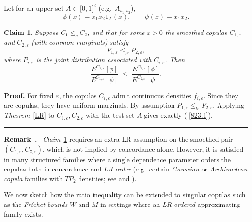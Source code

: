 \documentclass[onecolumn]{article}
\newtheorem{claim}[theorem]{Claim}
\newenvironment{remark}{  \refstepcounter{theorem}  \par\medskip\noindent\textbf{Remark~\thetheorem.}\rmfamily\ }{\par\medskip}
\newenvironment{proof}[1][Proof]{\noindent\textbf{#1.} }{\ \rule{0.5em}{0.5em}}
\begin{document}
Let for an upper set $A\subset \lbrack 0,1]^{2}$ (e.g.\ $A_{s_{1},s_{2}}$), 
\begin{equation}
\phi (x)=x_{1}x_{2}1_{A}(x),\qquad \psi (x)=x_{1}x_{2}.  \label{823}
\end{equation}

\begin{claim}
\label{smoothed-ratio} Suppose $C_{1}\leq _{c}C_{2}$, and that for some $%
\varepsilon >0$ the smoothed copulas $C_{1,\varepsilon }$ and $%
C_{2,\varepsilon }$ (with common marginals) satisfy 
\begin{equation}
P_{1,\varepsilon }\leq _{lr}P_{2,\varepsilon },  \label{823.0}
\end{equation}%
where $P_{i,\varepsilon }$ is the joint distribution associated with $%
C_{i,\varepsilon }$. Then 
\begin{equation}
\frac{E^{C_{1,\varepsilon }}[\phi ]}{E^{C_{1,\varepsilon }}[\psi ]}\;\leq \;%
\frac{E^{C_{2,\varepsilon }}[\phi ]}{E^{C_{2,\varepsilon }}[\psi ]}.
\label{823.1}
\end{equation}
\end{claim}

\begin{proof}
\noindent For fixed $\varepsilon $, the copulas $C_{i,\varepsilon }$ admit
continuous densities $f_{i,\varepsilon }$. Since they are copulas, they have
uniform marginals. By assumption $P_{1,\varepsilon }\leq
_{lr}P_{2,\varepsilon }$. Applying \textit{Theorem}~\ref{LR} to $%
C_{1,\varepsilon },C_{2,\varepsilon }$ with the test set $A$ gives exactly (%
\ref{823.1}).
\end{proof}

\begin{remark}
\textit{Claim}~\ref{smoothed-ratio} requires an extra LR assumption on the
smoothed pair $(C_{1,\varepsilon },C_{2,\varepsilon })$, which is not
implied by concordance alone. However, it is satisfied in many structured
families where a single dependence parameter orders the copulas both in
concordance and \textit{LR-order} (e.g.\ certain \textit{Gaussian} or 
\textit{Archimedean copula} families with $TP_{2}$ densities; see \cite{[32]}
and \cite{[28]}).
\end{remark}

We now sketch how the ratio inequality can be extended to singular copulas
such as the \textit{Fr\'{e}chet bounds} $W$ and $M$ in settings where an 
\textit{LR-ordered} approximating family exists.
\end{document}
